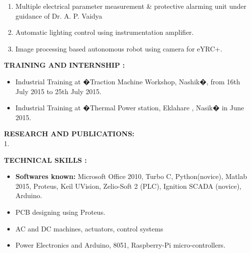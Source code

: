 \documentclass[12pt]{article}
\begin{document}
\begin{enumerate}
\item Multiple electrical parameter measurement & protective alarming unit under guidance of Dr. A. P. Vaidya
\item  Automatic lighting control using instrumentation amplifier.
\item Image processing based autonomous robot using camera for eYRC+. 
\end{enumerate}
\begin{flushleft}
\textbf{TRAINING AND INTERNSHIP :}
\begin{itemize}
\item Industrial Training at �Traction Machine Workshop, Nashik�, from 16th July 2015
to 25th July 2015.
\item Industrial Training at �Thermal Power station, Eklahare , Nasik� in June 2015.
\end{itemize}
\end{flushleft}
\begin{flushleft}
\textbf{RESEARCH AND PUBLICATIONS:}\\
1.
\end{flushleft}
\begin{flushleft}
\textbf{TECHNICAL SKILLS : }
\begin{itemize}
\item \textbf{Softwares known:} Microsoft Office 2010, Turbo C, Python(novice), Matlab 2015, Proteus, Keil UVision, Zelio-Soft 2 (PLC), Ignition SCADA (novice), Arduino.
\item PCB designing using Proteus.
\item AC and DC machines, actuators, control systems
\item Power Electronics and Arduino, 8051, Raspberry-Pi micro-controllers.
\end{itemize}
\end{flushleft}
\end{document}

